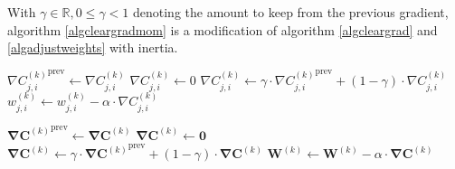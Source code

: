 \documentclass{article}
\begin{document}
        With $\gamma \in \mathbb{R}, 0 \leq \gamma < 1$ denoting the amount to
        keep from the previous gradient, algorithm \ref{algcleargradmom} is a
        modification of algorithm \ref{algcleargrad} and \ref{algadjustweights}
        with inertia.

        \begin{algorithm}
          \caption{%
            Modified version of algorithm \ref{algcleargrad} and
            \ref{algadjustweights} with inertia.
          } \label{algcleargradmom}
          \begin{algorithmic}
                    \State $
                      {\nabla C_{j,i}^{(k)}}^\text{prev} \gets
                        \nabla C_{j,i}^{(k)}
                    $
                    \State $\nabla C_{j,i}^{(k)} \gets 0$
                  \EndFor
                \EndFor
              \EndFor
            \EndProcedure
                    \State $
                      \nabla C_{j,i}^{(k)} \gets
                        \gamma \cdot {\nabla C_{j,i}^{(k)}}^\text{prev}
                        +
                        \left( 1 - \gamma \right) \cdot \nabla C_{j,i}^{(k)}
                    $
                    \State $
                      w_{j,i}^{(k)} \gets
                        w_{j,i}^{(k)} - \alpha \cdot \nabla C_{j,i}^{(k)}
                    $
                  \EndFor
                \EndFor
              \EndFor
            \EndProcedure
          \end{algorithmic}
        \end{algorithm}

        \begin{algorithm}
          \caption{%
            Algorithm \ref{algcleargradmom} with matrix-vector notation.
          }
          \begin{algorithmic}
                \State $
                  {\mathbf{\nabla C}^{(k)}}^\text{prev} \gets
                    \mathbf{\nabla C}^{(k)}
                $
                \State $\mathbf{\nabla C}^{(k)} \gets \mathbf{0}$
              \EndFor
            \EndProcedure
                \State $
                  \mathbf{\nabla C}^{(k)} \gets
                    \gamma \cdot {\mathbf{\nabla C}^{(k)}}^\text{prev}
                    + \left( 1 - \gamma \right) \cdot \mathbf{\nabla C}^{(k)}
                $
                \State $
                  \mathbf{W}^{(k)} \gets
                    \mathbf{W}^{(k)} - \alpha \cdot \mathbf{\nabla C}^{(k)}
                $
              \EndFor
            \EndProcedure
          \end{algorithmic}
        \end{algorithm}
\end{document}
